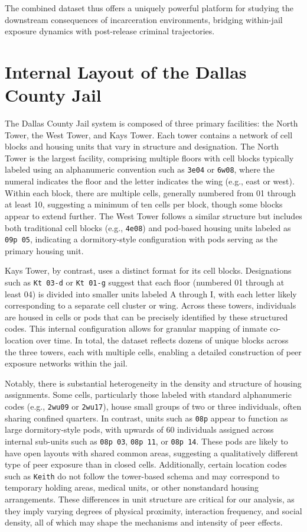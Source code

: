 \documentclass[12pt, a4paper]{article}
\begin{document}
The combined dataset thus offers a uniquely powerful platform for studying the downstream consequences of incarceration environments, bridging within-jail exposure dynamics with post-release criminal trajectories.

\section{Internal Layout of the Dallas County Jail}

The Dallas County Jail system is composed of three primary facilities: the North Tower, the West Tower, and Kays Tower. Each tower contains a network of cell blocks and housing units that vary in structure and designation. The North Tower is the largest facility, comprising multiple floors with cell blocks typically labeled using an alphanumeric convention such as \texttt{3e04} or \texttt{6w08}, where the numeral indicates the floor and the letter indicates the wing (e.g., east or west). Within each block, there are multiple cells, generally numbered from 01 through at least 10, suggesting a minimum of ten cells per block, though some blocks appear to extend further. The West Tower follows a similar structure but includes both traditional cell blocks (e.g., \texttt{4e08}) and pod-based housing units labeled as \texttt{09p 05}, indicating a dormitory-style configuration with pods serving as the primary housing unit.

Kays Tower, by contrast, uses a distinct format for its cell blocks. Designations such as \texttt{Kt 03-d} or \texttt{Kt 01-g} suggest that each floor (numbered 01 through at least 04) is divided into smaller units labeled A through I, with each letter likely corresponding to a separate cell cluster or wing. Across these towers, individuals are housed in cells or pods that can be precisely identified by these structured codes. This internal configuration allows for granular mapping of inmate co-location over time. In total, the dataset reflects dozens of unique blocks across the three towers, each with multiple cells, enabling a detailed construction of peer exposure networks within the jail.

Notably, there is substantial heterogeneity in the density and structure of housing assignments. Some cells, particularly those labeled with standard alphanumeric codes (e.g., \texttt{2wu09} or \texttt{2wu17}), house small groups of two or three individuals, often sharing confined quarters. In contrast, units such as \texttt{08p} appear to function as large dormitory-style pods, with upwards of 60 individuals assigned across internal sub-units such as \texttt{08p 03}, \texttt{08p 11}, or \texttt{08p 14}. These pods are likely to have open layouts with shared common areas, suggesting a qualitatively different type of peer exposure than in closed cells. Additionally, certain location codes such as \texttt{Keith} do not follow the tower-based schema and may correspond to temporary holding areas, medical units, or other nonstandard housing arrangements. These differences in unit structure are critical for our analysis, as they imply varying degrees of physical proximity, interaction frequency, and social density, all of which may shape the mechanisms and intensity of peer effects.
\end{document}
